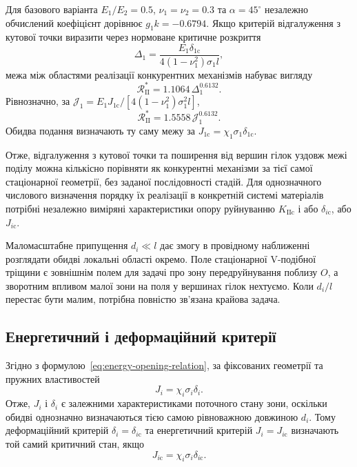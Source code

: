 Для базового варіанта $E_1/E_2=0.5$, $\nu_1=\nu_2=0.3$ та $\alpha=45^\circ$ незалежно обчислений коефіцієнт дорівнює $g_1k=-0.6794$. Якщо критерій відгалуження з кутової точки виразити через нормоване критичне розкриття
\begin{equation*}
  \Delta_1=
  \frac{E_1\delta_{1\mathrm{c}}}
  {4(1-\nu_1^2)\sigma_1l},
\end{equation*}
межа між областями реалізації конкурентних механізмів набуває вигляду
\begin{equation*}
  \mathcal R_{\mathrm{II}}^*
  =1.1064\,\Delta_1^{0.6132}.
\end{equation*}
Рівнозначно, за $\mathcal J_1=E_1J_{1\mathrm{c}}/
[4(1-\nu_1^2)\sigma_1^2l]$,
\begin{equation*}
  \mathcal R_{\mathrm{II}}^*
  =1.5558\,\mathcal J_1^{0.6132}.
\end{equation*}
Обидва подання визначають ту саму межу за $J_{1\mathrm{c}}=\chi_1\sigma_1\delta_{1\mathrm{c}}$.

Отже, відгалуження з кутової точки та поширення від вершин гілок уздовж межі поділу можна кількісно порівняти як конкурентні механізми за тієї самої стаціонарної геометрії, без заданої послідовності стадій. Для однозначного числового визначення порядку їх реалізації в конкретній системі матеріалів потрібні незалежно виміряні характеристики опору руйнуванню $K_{\mathrm{IIc}}$ і або $\delta_{i\mathrm{c}}$, або $J_{i\mathrm{c}}$.

Маломасштабне припущення $d_i\ll l$ дає змогу в провідному наближенні розглядати обидві локальні області окремо. Поле стаціонарної V-подібної тріщини є зовнішнім полем для задачі про зону передруйнування поблизу $O$, а зворотним впливом малої зони на поля у вершинах гілок нехтуємо. Коли $d_i/l$ перестає бути малим, потрібна повністю зв’язана крайова задача.

\subsection{Енергетичний і деформаційний критерії}
\label{subsec:discussion-criteria}

Згідно з формулою~\eqref{eq:energy-opening-relation}, за фіксованих геометрії та пружних властивостей
\begin{equation*}
  J_i=\chi_i\sigma_i\delta_i.
\end{equation*}
Отже, $J_i$ і $\delta_i$ є залежними характеристиками поточного стану зони, оскільки обидві однозначно визначаються тією самою рівноважною довжиною $d_i$. Тому деформаційний критерій $\delta_i=\delta_{i\mathrm{c}}$ та енергетичний критерій $J_i=J_{i\mathrm{c}}$ визначають той самий критичний стан, якщо
\begin{equation*}
  J_{i\mathrm{c}}
  =\chi_i\sigma_i\delta_{i\mathrm{c}}.
\end{equation*}


